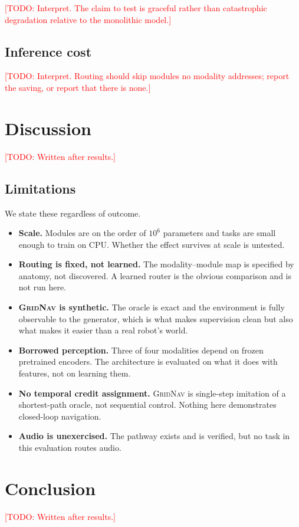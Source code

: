 \documentclass[conference]{IEEEtran}
\newcommand{\todo}[1]{\textcolor{red}{[TODO: #1]}}
\begin{document}
\todo{Interpret. The claim to test is graceful rather than catastrophic
degradation relative to the monolithic model.}

\subsection{Inference cost}



\todo{Interpret. Routing should skip modules no modality addresses; report the
saving, or report that there is none.}

\section{Discussion}

\todo{Written after results.}

\subsection{Limitations}

We state these regardless of outcome.

\begin{itemize}
  \item \textbf{Scale.} Modules are on the order of $10^6$ parameters and tasks
        are small enough to train on CPU. Whether the effect survives at scale
        is untested.
  \item \textbf{Routing is fixed, not learned.} The modality--module map is
        specified by anatomy, not discovered. A learned router is the obvious
        comparison and is not run here.
  \item \textbf{\textsc{GridNav} is synthetic.} The oracle is exact and the
        environment is fully observable to the generator, which is what makes
        supervision clean but also what makes it easier than a real robot's
        world.
  \item \textbf{Borrowed perception.} Three of four modalities depend on frozen
        pretrained encoders. The architecture is evaluated on what it does with
        features, not on learning them.
  \item \textbf{No temporal credit assignment.} \textsc{GridNav} is single-step
        imitation of a shortest-path oracle, not sequential control. Nothing
        here demonstrates closed-loop navigation.
  \item \textbf{Audio is unexercised.} The pathway exists and is verified, but
        no task in this evaluation routes audio.
\end{itemize}

\section{Conclusion}

\todo{Written after results.}



\end{document}
